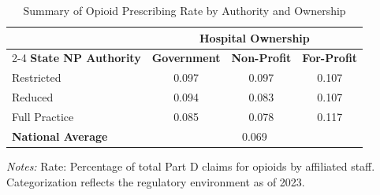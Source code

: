 \begin{table}[htbp]
    \centering
    \caption{Summary of Opioid Prescribing Rate by Authority and Ownership}
    \label{tab:partd_opioid_rate_own}
    \vspace{0.2cm}
    \begin{tabular}{lccc}
        \toprule
        & \multicolumn{3}{c}{\textbf{Hospital Ownership}} \\
        \cmidrule(lr){2-4}
        \textbf{State NP Authority} & \textbf{Government} & \textbf{Non-Profit} & \textbf{For-Profit} \\
        \midrule
        Restricted & 0.097 & 0.097 & 0.107 \\
        Reduced & 0.094 & 0.083 & 0.107 \\
        Full Practice & 0.085 & 0.078 & 0.117 \\
        \midrule
        \textbf{National Average} & \multicolumn{3}{c}{0.069} \\
        \bottomrule
    \end{tabular}
    \vspace{0.1cm}
    \begin{minipage}{0.85\textwidth}
        \footnotesize \textit{Notes:} Rate: Percentage of total Part D claims for opioids by affiliated staff. Categorization reflects the regulatory environment as of 2023.
    \end{minipage}
\end{table}
